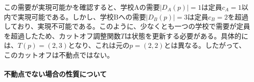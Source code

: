 \documentclass[12pt, a4paper]{article}
\theoremstyle{definition}
\theoremstyle{remark}
\theoremstyle{plain}
\begin{document}
この需要が実現可能かを確認すると、学校Aの需要$|D_A(p)|=1$は定員$c_A=1$以内で実現可能である。しかし、学校Bへの需要$|D_B(p)|=3$は定員$c_B=2$を超過しており、実現不可能である。このように、少なくとも一つの学校で需要が定員を超過したため、カットオフ調整関数$T$は状態を更新する必要がある。具体的には、$T(p)=(2,3)$となり、これは元の$p=(2,2)$とは異なる。したがって、このカットオフは不動点ではない。









\paragraph{不動点でない場合の性質について}
\end{document}
